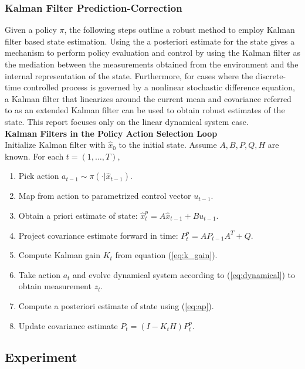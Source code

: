 \documentclass{article}
\begin{document}
\subsubsection{Kalman Filter Prediction-Correction}
Given a policy $\pi$, the following steps outline a robust method to employ Kalman filter based state estimation. Using the a posteriori estimate for the state gives a mechanism to perform policy evaluation and control by using the Kalman filter as the mediation between the measurements obtained from the environment and the internal representation of the state. Furthermore, for cases where the discrete-time controlled process is governed by a nonlinear stochastic difference equation, a Kalman filter that linearizes around the current mean and covariance referred to as an extended Kalman filter can be used to obtain robust estimates of the state. \cite{welchBishop} This report focuses only on the linear dynamical system case. \\

\noindent
\textbf{Kalman Filters in the Policy Action Selection Loop} \\

\noindent
Initialize Kalman filter with $\hat{x}_0$ to the initial state. Assume $A, B, P, Q, H$ are known. For each $t = (1, \ldots, T)$, 
\begin{enumerate}
	\item Pick action $a_{t-1} \sim \pi(\cdot | \hat{x}_{t-1})$. 
	\item Map from action to parametrized control vector $u_{t-1}$.
	\item Obtain a priori estimate of state: $\hat{x}_t^p = A\hat{x}_{t-1} + Bu_{t-1}$.
	\item Project covariance estimate forward in time: $P_{t}^p = AP_{t-1}A^T + Q$.
	\item Compute Kalman gain $K_t$ from equation (\ref{eq:k_gain}).
	\item Take action $a_t$ and evolve dynamical system according to (\ref{eq:dynamical}) to obtain measurement $z_t$.
	\item Compute a posteriori estimate of state using (\ref{eq:ap}).
	\item Update covariance estimate $P_t = (I - K_tH)P_t^p$.
\end{enumerate}

\subsection{Experiment}
\end{document}
